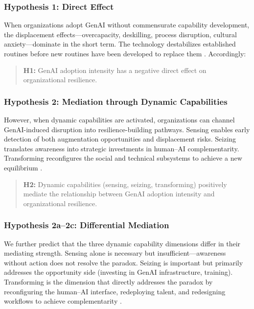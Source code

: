 \documentclass[12pt, a4paper]{article}
\begin{document}
\subsubsection{Hypothesis 1: Direct Effect}

When organizations adopt GenAI without commensurate capability development, the displacement effects---overcapacity, deskilling, process disruption, cultural anxiety---dominate in the short term. The technology destabilizes established routines before new routines have been developed to replace them \citep{Leonardi2020}. Accordingly:

\begin{quote}
\textbf{H1:} GenAI adoption intensity has a negative direct effect on organizational resilience.
\end{quote}

\subsubsection{Hypothesis 2: Mediation through Dynamic Capabilities}

However, when dynamic capabilities are activated, organizations can channel GenAI-induced disruption into resilience-building pathways. Sensing enables early detection of both augmentation opportunities and displacement risks. Seizing translates awareness into strategic investments in human--AI complementarity. Transforming reconfigures the social and technical subsystems to achieve a new equilibrium \citep{Teece2018, Warner2019}.

\begin{quote}
\textbf{H2:} Dynamic capabilities (sensing, seizing, transforming) positively mediate the relationship between GenAI adoption intensity and organizational resilience.
\end{quote}

\subsubsection{Hypothesis 2a--2c: Differential Mediation}

We further predict that the three dynamic capability dimensions differ in their mediating strength. Sensing alone is necessary but insufficient---awareness without action does not resolve the paradox. Seizing is important but primarily addresses the opportunity side (investing in GenAI infrastructure, training). Transforming is the dimension that directly addresses the paradox by reconfiguring the human--AI interface, redeploying talent, and redesigning workflows to achieve complementarity \citep{Teece2018, Helfat2018}.
\end{document}

